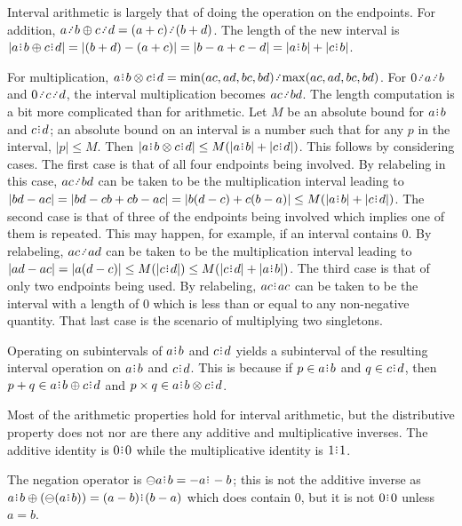 \documentclass[12pt]{article}
\begin{document}
Interval arithmetic is largely that of doing the operation on the endpoints. For addition, $a \lte b \oplus c \lte d = (a+c) \lte (b+d)$. The length of the new interval is $|a\rint b \oplus c\rint d| = |(b+d) - (a + c)| = |b-a+ c-d| = |a\rint b|+|c\rint b|$.

For multiplication, $a\rint b \otimes c\rint d = \min(ac, ad, bc, bd)\lte \max(ac, ad, bc, bd)$. For $0 \lte a \lte b$ and $0 \lte c \lte d$, the interval multiplication becomes $ac \lte bd$. The length computation is a bit more complicated than for arithmetic. Let $M$ be an absolute bound for $a\rint b$ and $c\rint d$; an absolute bound on an interval is a number such that for any $p$ in the interval, $|p| \leq M$. Then $|a\rint b \otimes c\rint d| \leq M(|a\rint b| + |c\rint d|)$. This follows by considering cases. The first case is that of all four endpoints being involved. By relabeling in this case,  $ac \lte bd$ can be taken to be the multiplication interval leading to $|bd - ac| = |bd - cb + cb - ac| = |b(d-c) + c (b-a)| \leq M (|a\rint b| + |c\rint d|)$. The second case is that of three of the endpoints being involved which implies one of them is repeated. This may happen, for example, if an interval contains 0. By relabeling, $ac \lte ad$ can be taken to be the multiplication interval leading to $|ad - ac| = |a(d-c)| \leq  M (|c\rint d|) \leq M (|c\rint d| + |a\rint b|)$. The third case is that of only two endpoints being used. By relabeling, $ac\rint ac$ can be taken to be the interval with a length of 0 which is less than or equal to any non-negative quantity.  That last case is the scenario of multiplying two singletons. 

 Operating on subintervals of $a\rint b$ and $c\rint d$ yields a subinterval of the resulting interval operation on $a\rint b$ and $c\rint d$. This is because if $p \in a\rint b$ and $q \in c\rint d$, then $p + q \in a\rint b \oplus c\rint d$ and $p \times q \in a\rint b \otimes c\rint d$. 

Most of the arithmetic properties hold for interval arithmetic, but the distributive property does not nor are there any additive and multiplicative inverses. The additive identity is $0\rint 0$ while the multiplicative identity is $1\rint 1$.

The negation operator is $\ominus a\rint b  = -a\rint -b$; this is not the additive inverse as $a\rint b \oplus (\ominus(a \rint b )) = (a-b)\rint (b-a)$ which does contain 0, but it is not $0\rint 0$ unless $a = b$. 
\end{document}
